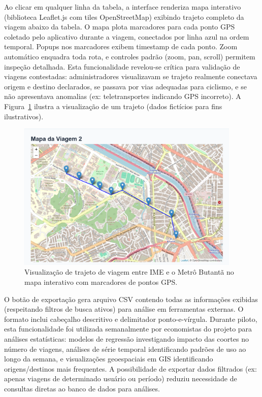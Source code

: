 Ao clicar em qualquer linha da tabela, a interface renderiza mapa interativo (biblioteca Leaflet.js com tiles OpenStreetMap) exibindo trajeto completo da viagem abaixo da tabela. O mapa plota marcadores para cada ponto GPS coletado pelo aplicativo durante a viagem, conectados por linha azul na ordem temporal. Popups nos marcadores exibem timestamp de cada ponto. Zoom automático enquadra toda rota, e controles padrão (zoom, pan, scroll) permitem inspeção detalhada. Esta funcionalidade revelou-se crítica para validação de viagens contestadas: administradores visualizavam se trajeto realmente conectava origem e destino declarados, se passava por vias adequadas para ciclismo, e se não apresentava anomalias (ex: teletransportes indicando GPS incorreto). A Figura~\ref{fig:mapa_contestacao} ilustra a visualização de um trajeto (dados fictícios para fins ilustrativos).

\begin{figure}[htb]
    \centering
    \includegraphics[width=0.95\textwidth]{figuras/mapa_contestacao.PNG}
    \caption{Visualização de trajeto de viagem entre IME e o Metrô Butantã no mapa interativo com marcadores de pontos GPS.}
    \label{fig:mapa_contestacao}
  \end{figure}

O botão de exportação gera arquivo CSV contendo todas as informações exibidas (respeitando filtros de busca ativos) para análise em ferramentas externas. O formato inclui cabeçalho descritivo e delimitador ponto-e-vírgula. Durante piloto, esta funcionalidade foi utilizada semanalmente por economistas do projeto para análises estatísticas: modelos de regressão investigando impacto das coortes no número de viagens, análises de série temporal identificando padrões de uso ao longo da semana, e visualizações geoespaciais em GIS identificando origens/destinos mais frequentes. A possibilidade de exportar dados filtrados (ex: apenas viagens de determinado usuário ou período) reduziu necessidade de consultas diretas ao banco de dados para análises.

